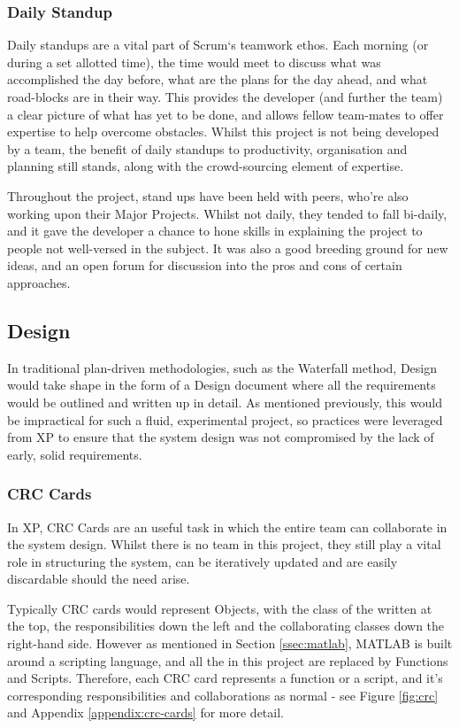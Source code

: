 \subsubsection{Daily Standup}

Daily standups are a vital part of Scrum`s teamwork ethos. Each morning (or during a set allotted time), the time would meet to discuss what was accomplished the day before, what are the plans for the day ahead, and what road-blocks are in their way. This provides the developer (and further the team) a clear picture of what has yet to be done, and allows fellow team-mates to offer expertise to help overcome obstacles. Whilst this project is not being developed by a team, the benefit of daily standups to productivity, organisation and planning still stands, along with the crowd-sourcing element of expertise.

Throughout the project, stand ups have been held with peers, who're also working upon their Major Projects. Whilst not daily, they tended to fall bi-daily, and it gave the developer a chance to hone skills in explaining the project to people not well-versed in the subject. It was also a good breeding ground for new ideas, and an open forum for discussion into the pros and cons of certain approaches.

\subsection{Design}

In traditional plan-driven methodologies, such as the Waterfall method, Design would take shape in the form of a Design document where all the requirements would be outlined and written up in detail. As mentioned previously, this would be impractical for such a fluid, experimental project, so practices were leveraged from \acrfull{XP} to ensure that the system design was not compromised by the lack of early, solid requirements.

\subsubsection{CRC Cards}

In \acrshort{XP}, \acrfull{CRC} Cards are an useful task in which the entire team can collaborate in the system design. Whilst there is no team in this project, they still play a vital role in structuring the system, can be iteratively updated and are easily discardable should the need arise.

Typically \acrshort{CRC} cards would represent Objects, with the class of the written at the top, the responsibilities down the left and the collaborating classes down the right-hand side. However as mentioned in Section \ref{ssec:matlab}, MATLAB is built around a scripting language, and all the  in this project are replaced by Functions and Scripts. Therefore, each \acrshort{CRC} card represents a function or a script, and it's corresponding responsibilities and collaborations as normal - see Figure \ref{fig:crc} and Appendix \ref{appendix:crc-cards} for more detail.

